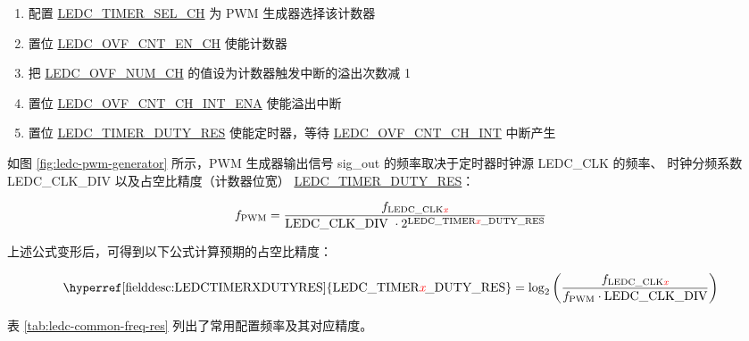 \documentclass[main\_\_CN.tex]{subfiles}
\begin{document}
\begin{enumerate}
    \item 配置 \hyperref[fielddesc:LEDCTIMERSELCHN]{LEDC\_TIMER\_SEL\_CH} 为 PWM 生成器选择该计数器
    \item 置位 \hyperref[fielddesc:LEDCOVFCNTENCHN]{LEDC\_OVF\_CNT\_EN\_CH} 使能计数器
    \item 把 \hyperref[fielddesc:LEDCOVFNUMCHN]{LEDC\_OVF\_NUM\_CH} 的值设为计数器触发中断的溢出次数减 1
    \item 置位 \hyperref[fielddesc:LEDCOVFCNTCHNINTENA]{LEDC\_OVF\_CNT\_CH\_INT\_ENA} 使能溢出中断
    \item 置位 \hyperref[fielddesc:LEDCTIMERXDUTYRES]{LEDC\_TIMER\_DUTY\_RES} 使能定时器，等待 \hyperref[int:ledc-ovf-cnt]{LEDC\_OVF\_CNT\_CH\_INT} 中断产生
\end{enumerate}

如图 \ref{fig:ledc-pwm-generator} 所示，PWM 生成器输出信号 sig\_out 的频率取决于定时器时钟源 LEDC\_CLK 的频率、 时钟分频系数 LEDC\_CLK\_DIV 以及占空比精度（计数器位宽） \hyperref[fielddesc:LEDCTIMERXDUTYRES]{LEDC\_TIMER\_DUTY\_RES}：

    \[
    f_{\textrm{PWM}}=\frac{f_{\textrm{LEDC\_CLK\textcolor{red}{\it{x}}}}}
                        {\textrm{LEDC\_CLK\_DIV }\cdot 2^{\textrm{LEDC\_TIMER}\textcolor{red}{\it{x}}\_\textrm{DUTY\_RES}}}
    \]
    
上述公式变形后，可得到以下公式计算预期的占空比精度：

    \[
    \textrm{\hyperref[fielddesc:LEDCTIMERXDUTYRES]{LEDC\_TIMER\regindex{x}\_DUTY\_RES}}
    =\log_2\left(\frac{f_{\textrm{LEDC\_CLK\regindex{x}}}}
    {f_{\textrm{PWM}}\cdot \textrm{LEDC\_CLK\_DIV}}\right)
    \]

表 \ref{tab:ledc-common-freq-res} 列出了常用配置频率及其对应精度。
\end{document}
